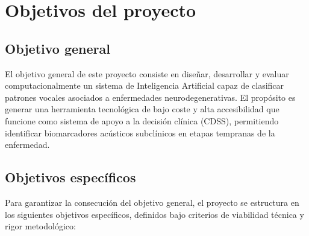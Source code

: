 \section{Objetivos del proyecto}

\subsection{Objetivo general}
El objetivo general de este proyecto consiste en diseñar, desarrollar y evaluar computacionalmente un sistema de Inteligencia Artificial capaz de clasificar patrones vocales asociados a enfermedades neurodegenerativas. El propósito es generar una herramienta tecnológica de bajo coste y alta accesibilidad que funcione como sistema de apoyo a la decisión clínica (CDSS), permitiendo identificar biomarcadores acústicos subclínicos en etapas tempranas de la enfermedad.

\subsection{Objetivos específicos}
Para garantizar la consecución del objetivo general, el proyecto se estructura en los siguientes objetivos específicos, definidos bajo criterios de viabilidad técnica y rigor metodológico:

